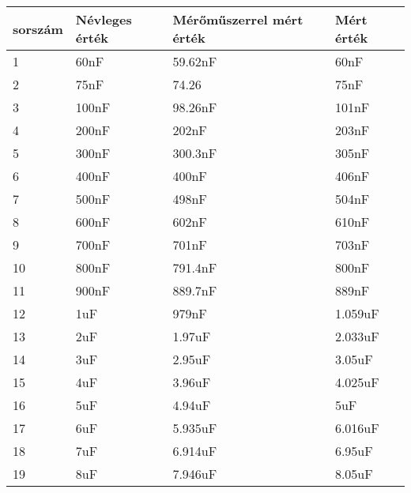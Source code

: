 \begin{table}[h]
    \begin{tabular}{|l|l|l|l|}
    \hline
    sorszám & Névleges érték & Mérőműszerrel mért érték & Mért érték \\ \hline
    1       & 60nF           & 59.62nF                  & 60nF       \\ \hline
    2       & 75nF           & 74.26                    & 75nF       \\ \hline
    3       & 100nF          & 98.26nF                  & 101nF      \\ \hline
    4       & 200nF          & 202nF                    & 203nF      \\ \hline
    5       & 300nF          & 300.3nF                  & 305nF      \\ \hline
    6       & 400nF          & 400nF                    & 406nF      \\ \hline
    7       & 500nF          & 498nF                    & 504nF      \\ \hline
    8       & 600nF          & 602nF                    & 610nF      \\ \hline
    9       & 700nF          & 701nF                    & 703nF      \\ \hline
    10      & 800nF          & 791.4nF                  & 800nF      \\ \hline
    11      & 900nF          & 889.7nF                  & 889nF      \\ \hline
    12      & 1uF            & 979nF                    & 1.059uF    \\ \hline
    13      & 2uF            & 1.97uF                   & 2.033uF    \\ \hline
    14      & 3uF            & 2.95uF                   & 3.05uF     \\ \hline
    15      & 4uF            & 3.96uF                   & 4.025uF    \\ \hline
    16      & 5uF            & 4.94uF                   & 5uF        \\ \hline
    17      & 6uF            & 5.935uF                  & 6.016uF    \\ \hline
    18      & 7uF            & 6.914uF                  & 6.95uF     \\ \hline
    19      & 8uF            & 7.946uF                  & 8.05uF     \\ \hline
    \end{tabular}
    \end{table}

